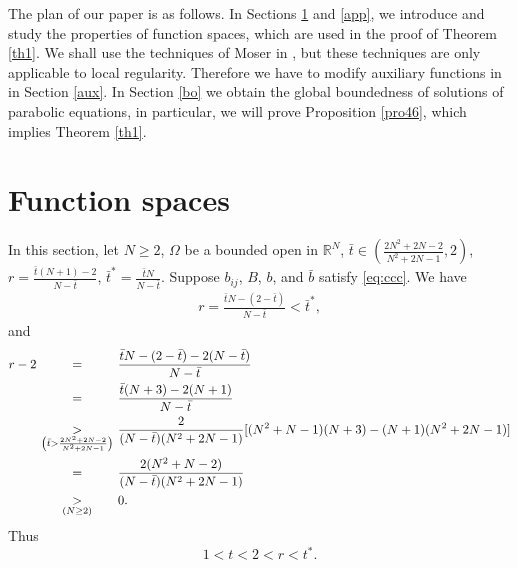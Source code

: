 \documentclass[11pt, a4paper]{article}
\numberwithin{equation}{section}
\newcommand{\coex}[2][\hphantom{longexplanation}]{%
  \underset{{#1}}{\overset{\hphantom{longexplanation}}{#2}}
}
\newcommand{\RR}{{\mathbb R}}
\begin{document}
The plan of our paper is as follows.  In Sections \ref{wi} and
\ref{app}, we introduce and study the properties of function spaces,
which are used in the proof of Theorem \ref{th1}. We shall use the
techniques of Moser in \cite{moserHarnackInequalityParabolic1964}, but
these techniques are only applicable to local regularity. Therefore we
have to modify auxiliary functions in
\cite{moserHarnackInequalityParabolic1964} in Section \ref{aux}.  In
Section \ref{bo} we obtain the global boundedness of solutions of
parabolic equations, in particular, we will prove Proposition
\ref{pro46}, which implies Theorem \ref{th1}.

\section{Function spaces}\label{wi}

In this section, let $N\ge 2$, $\Omega$ be a bounded open in
$\RR^{N}$, $\bar{t}\in \left(\frac{2N^{2}+2N-2}{N^{2}+2N-1},2 \right)$,
$r=\frac{\bar{t}(N+1)-2}{N-\bar{t}}$, $\bar{t}^{\ast}=\frac{\bar{t}N}{N-\bar{t}}$. Suppose $b_{ij}$,
$B$, $b$, and $\bar{b}$ satisfy \eqref{eq:ccc}. We have
\begin{align*}
  r
  = \frac{\bar{t}N-(2-\bar{t})}{N-\bar{t}}< \bar{t}^{\ast},
\end{align*}
and
\begin{align*}
  r-2
  &\coex{=} \frac{\bar{t}N-(2-\bar{t}) -2(N-\bar{t})}{N-\bar{t}}\\
  &\coex{=} \frac{\bar{t}(N+3) -2(N+1)}{N-\bar{t}}\\
&\coex[\left(\bar{t}>\frac{2N^{2}+2N-2}{N^{2}+2N-1}\right)]{>} \frac{2}{(N-\bar{t})(N^{2}+2N-1)}[(N^{2}+N-1)(N+3)-(N+1)(N^{2}+2N-1)]\\
  &\coex{=}\frac{2(N^{2}+N-2)}{(N-\bar{t})(N^{2}+2N-1)}\\
  &\coex[(N\ge 2)]{>} 0.
\end{align*}
Thus
\begin{equation}
  1< t<2 < r <t^{\ast}.
 \label{rt}
\end{equation}
\end{document}
